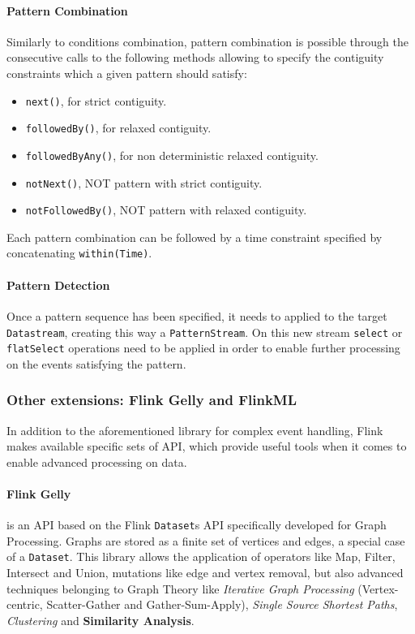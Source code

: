\paragraph{Pattern Combination}

Similarly to conditions combination, pattern combination is possible through the consecutive calls to the following methods allowing to specify the contiguity constraints which a given pattern should satisfy:

\begin{itemize}
    
    \item \texttt{next()}, for strict contiguity.
    \item \texttt{followedBy()}, for relaxed contiguity.
    \item \texttt{followedByAny()}, for non deterministic relaxed contiguity.
    \item \texttt{notNext()}, NOT pattern with strict contiguity.
    \item \texttt{notFollowedBy()}, NOT pattern with relaxed contiguity.

\end{itemize}

Each pattern combination can be followed by a time constraint specified by concatenating \texttt{within(Time)}.

\paragraph{Pattern Detection}

Once a pattern sequence has been specified, it needs to applied to the target \texttt{Datastream}, creating this way a \texttt{PatternStream}.
On this new stream \texttt{select} or \texttt{flatSelect} operations need to be applied in order to enable further processing on the events satisfying the pattern.

\subsubsection{Other extensions: Flink Gelly and FlinkML}

In addition to the aforementioned library for complex event handling, Flink makes available specific sets of API, which provide useful tools when it comes to enable advanced processing on data.

\paragraph{Flink Gelly} is an API based on the Flink \texttt{Dataset}s API specifically developed for Graph Processing. Graphs are stored as a finite set of vertices and edges, a special case of a \texttt{Dataset}. This library allows the application of operators like Map, Filter, Intersect and Union, mutations like edge and vertex removal, but also advanced techniques belonging to Graph Theory like \textit{Iterative Graph Processing} (Vertex-centric, Scatter-Gather and Gather-Sum-Apply), \textit{Single Source Shortest Paths}, \textit{Clustering} and \textbf{Similarity Analysis}.

